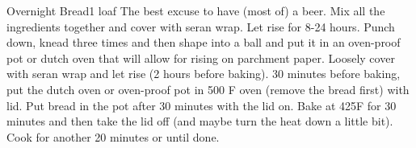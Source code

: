 \begin{recipe}{Overnight Bread}{1 loaf}{}
\freeform The best excuse to have (most of) a beer.
Mix all the ingredients together and cover with seran wrap. Let rise for 8-24 hours. Punch down, knead three times and then shape into a ball and put it in an oven-proof pot or dutch oven that will allow for rising on parchment paper. Loosely cover with seran wrap and let rise (2 hours before baking). 30 minutes before baking, put the dutch oven or oven-proof pot in 500 F oven (remove the bread first) with lid. Put bread in the pot after 30 minutes with the lid on. Bake at 425F for 30 minutes and then take the lid off (and maybe turn the heat down a little bit). Cook for another 20 minutes or until done.
\end{recipe}
